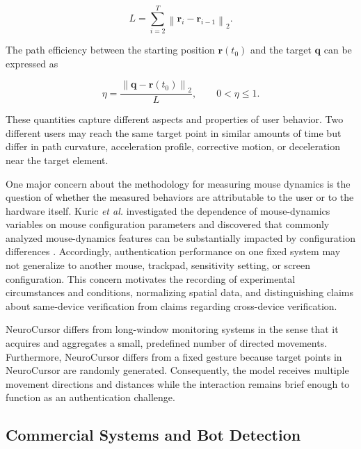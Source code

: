 \documentclass[conference]{IEEEtran}
\begin{document}
\begin{equation}
L=
\sum_{i=2}^{T}
\left\|
\mathbf{r}_i-\mathbf{r}_{i-1}
\right\|_2.
\label{eq:discrete_path_length}
\end{equation}

The path efficiency between the starting position $\mathbf{r}(t_0)$ and the target $\mathbf{q}$ can be expressed as 

\begin{equation}
\eta
=
\frac{
\left\|
\mathbf{q}-\mathbf{r}(t_0)
\right\|_2
}{
L
},
\qquad
0 < \eta \leq 1.
\label{eq:path_efficiency}
\end{equation}

These quantities capture different aspects and properties of user behavior. Two different users may reach the same target point in similar amounts of time but differ in path curvature, acceleration profile, corrective motion, or deceleration near the target element. 

One major concern about the methodology for measuring mouse dynamics is the question of whether the measured behaviors are attributable to the user or to the hardware itself. Kuric \textit{et al.} investigated the dependence of mouse-dynamics variables on mouse configuration parameters and discovered that commonly analyzed mouse-dynamics features can be substantially impacted by configuration differences \cite{kuricMouseCredibility}. Accordingly, authentication performance on one fixed system may not generalize to another mouse, trackpad, sensitivity setting, or screen configuration. This concern motivates the recording of experimental circumstances and conditions, normalizing spatial data, and distinguishing claims about same-device verification from claims regarding cross-device verification. 

NeuroCursor differs from long-window monitoring systems in the sense that it acquires and aggregates a small, predefined number of directed movements. Furthermore, NeuroCursor differs from a fixed gesture because target points in NeuroCursor are randomly generated. Consequently, the model receives multiple movement directions and distances while the interaction remains brief enough to function as an authentication challenge. 


\subsection{Commercial Systems and Bot Detection}
\end{document}
